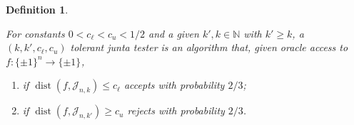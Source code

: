 \documentclass[10pt,a4paper]{article}
\theoremstyle{plain}
\newtheorem{definition}[theorem]{Definition}
\theoremstyle{remark}
\theoremstyle{plain}
\newcommand{\N}{\mathbb{N}}
\newcommand{\dist}{\operatorname{dist}}
\newcommand{\Juntas}[2]{\mathcal{J}_{#1, #2}}
\newcommand{\BooleanHypercube}[1]{\{\pm 1\}^{#1}}
\begin{document}
\begin{definition}
\label{definition:tolerant-junta-testing}

For constants $0 < c_\ell < c_u < 1/2$ and a given $k',k\in \N$ with $k'\geq k$, a \emph{$(k, k', c_\ell, c_u)$ tolerant junta tester} is an algorithm that, given oracle access to $f: \BooleanHypercube{n} \to \BooleanHypercube{}$, 
\begin{enumerate}
    \item if $\dist(f, \Juntas{n}{k}) \leq c_\ell$ accepts with probability $2/3$;
    \item if $\dist(f, \Juntas{n}{k'}) \geq c_u$ rejects with probability $2/3$.
\end{enumerate}
\end{definition}
\begin{figure}
    \centering



\begin{tikzpicture}[x=0.75pt,y=0.75pt,yscale=-1,xscale=1]


\end{tikzpicture}
\end{figure}
\end{document}
